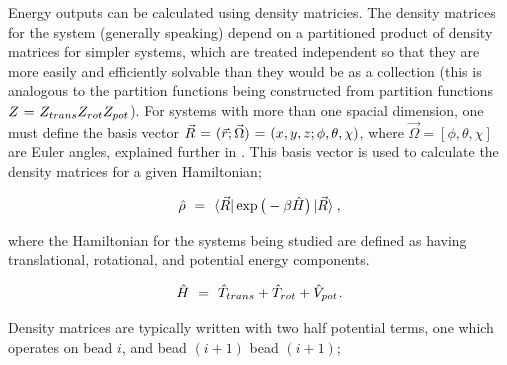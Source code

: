 \documentclass{ece}
\begin{document}
Energy outputs can be calculated using density matricies. The density matrices for the system (generally speaking) depend on a partitioned product of density matrices for simpler systems, which are treated independent so that they are more easily and efficiently solvable than they would be as a collection (this is  analogous to the partition functions being constructed from partition functions \begin{math} Z \hspace{0.025cm} = \hspace{0.025cm} Z_{trans} Z_{rot} Z_{pot} \end{math}). For systems with more than one spacial dimension, one must define the basis vector \begin{math} \vec{R} \hspace{0.025cm} = \hspace{0.025cm} (\vec{r};\vec{\Omega})  \hspace{0.025cm} = \hspace{0.025cm} (x,y,z;\phi,\theta,\chi) \end{math}, where \begin{math} \vec{\Omega} = [\phi,\theta,\chi] \end{math} are Euler angles, explained further in . This basis vector is used to calculate the density matrices for a given Hamiltonian;

\begin{equation} \label{eq:36}
\hat{\rho} \hspace{0.125cm} = \hspace{0.125cm} \bra{\vec{R}} \exp \big( - \beta \hat{H} \big) \ket{\vec{R}} \hspace{0.025cm} , 
\end{equation}

where the Hamiltonian for the systems being studied are defined as having translational, rotational, and potential energy components.

\begin{equation} \label{eq:37}
\hat{H} \hspace{0.125cm} = \hspace{0.125cm} \hat{T}_{trans} + \hat{T}_{rot} + \hat{V}_{pot} \hspace{0.025cm} .
\end{equation}

Density matrices are typically written with two half potential terms, one which operates on bead \begin{math} i \end{math}, and bead \begin{math} (i+1) \end{math} bead \begin{math} (i+1) \end{math};
\end{document}
